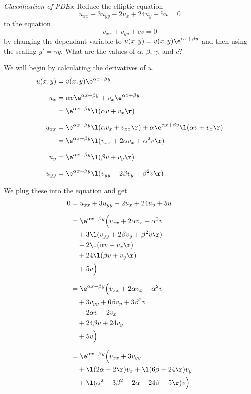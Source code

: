 \documentclass[a4paper]{article}
\begin{document}


\begin{questionbody}
\textit{Classification of PDEs}: Reduce the elliptic equation \[
u_{xx} + 3 u_{yy} - 2 u_x + 24 u_y + 5u = 0
\] to the equation \[
v_{xx} + v_{yy} + cv = 0
\] by changing the dependant variable to $u(x, y) = v(x, y) \e^{\alpha x + \beta y}$ and then using the scaling $y' = \gamma y$. What are the values of $\alpha$, $\beta$, $\gamma$, and $c$?
\end{questionbody}

We will begin by calculating the derivatives of $u$.
\begin{align*}
u(x, y) &= v(x, y) \e^{\alpha x + \beta y} \\[1.5ex]
%
u_x &= \alpha v \e^{\alpha x + \beta y} + v_x \e^{\alpha x + \beta y} \\[0.5ex]
&= \e^{\alpha x + \beta y} \l( \alpha v + v_x \r) \\[1.5ex]
%
u_{xx} &= \e^{\alpha x + \beta y} \l( \alpha v_x + v_{xx} \r) + \alpha \e^{\alpha x + \beta y} \l( \alpha v + v_x \r) \\[0.5ex]
&= \e^{\alpha x + \beta y} \l( v_{xx} + 2\alpha v_x + \alpha^2 v \r) \\[1.5ex]
%
u_y &= \e^{\alpha x + \beta y} \l( \beta v + v_y \r) \\[1.5ex]
%
u_{yy} &= \e^{\alpha x + \beta y} \l( v_{yy} + 2\beta v_y + \beta^2 v \r)
\end{align*}

We plug these into the equation and get \[ \begin{split}
0 &= u_{xx} + 3 u_{yy} - 2 u_x + 24 u_y + 5u \\[1.5ex]
&= \e^{\alpha x + \beta y} \Big(
    v_{xx} + 2\alpha v_x + \alpha^2 v \\
    &\quad + 3 \l( v_{yy} + 2\beta v_y + \beta^2 v \r) \\
    &\quad - 2 \l( \alpha v + v_x \r) \\
    &\quad + 24 \l( \beta v + v_y \r) \\
    &\quad + 5v
\Big) \\[1.5ex]
&= \e^{\alpha x + \beta y} \Big(
    v_{xx} + 2 \alpha v_x + \alpha^2 v \\
    &\quad + 3 v_{yy} + 6 \beta v_y + 3 \beta^2 v \\
    &\quad - 2 \alpha v - 2 v_x \\
    &\quad + 24 \beta v + 24 v_y \\
    &\quad + 5v
\Big) \\[1.5ex]
&= \e^{\alpha x + \beta y} \Big(
    v_{xx} + 3 v_{yy} \\
    &\quad + \l( 2\alpha - 2 \r) v_x + \l( 6\beta + 24 \r) v_y \\
    &\quad + \l( \alpha^2 + 3\beta^2 - 2\alpha + 24\beta + 5 \r) v
\Big)
\end{split} \]
\end{document}
